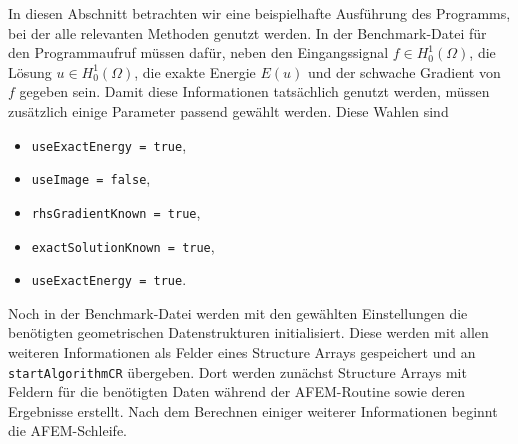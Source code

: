 In diesen Abschnitt betrachten wir eine beispielhafte Ausführung des Programms,
bei der alle relevanten Methoden genutzt werden.
In der Benchmark-Datei für den Programmaufruf müssen dafür, neben den
Eingangssignal $f\in H^1_0(\Omega)$, die Lösung $u\in H^1_0(\Omega)$, die
exakte Energie $E(u)$ und der schwache Gradient von $f$ gegeben sein. 
Damit diese Informationen tatsächlich genutzt werden, müssen zusätzlich einige
Parameter passend gewählt werden. 
Diese Wahlen sind
\begin{itemize}
  \item \texttt{useExactEnergy = true},
  \item \texttt{useImage = false},
  \item \texttt{rhsGradientKnown = true},
  \item \texttt{exactSolutionKnown = true},
  \item \texttt{useExactEnergy = true}.
\end{itemize}
Noch in der Benchmark-Datei werden mit den gewählten Einstellungen die
benötigten geometrischen Datenstrukturen initialisiert. 
Diese werden mit allen weiteren Informationen als Felder eines Structure Arrays
gespeichert und an \texttt{startAlgorithmCR} übergeben. 
Dort werden zunächst Structure Arrays mit Feldern für die benötigten Daten
während der AFEM-Routine sowie deren Ergebnisse erstellt. 
Nach dem Berechnen einiger weiterer Informationen beginnt die AFEM-Schleife.


